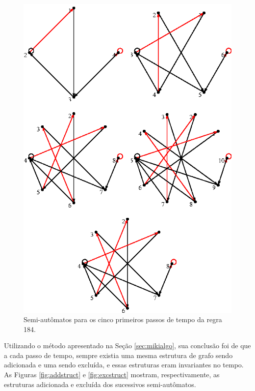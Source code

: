 \documentclass[12pt,a4paper]{article}
\begin{document}
\begin{figure}[htp]
\begin{center}
\includegraphics[scale=1]{img/184_5t.eps}
\caption{Semi-autômatos para os cinco primeiros passos de tempo da regra 184.}
\label{fig:184-5t}
\end{center}
\end{figure}

Utilizando o método apresentado na Seção \ref{sec:mikialgo}, sua conclusão
foi de que a cada passo de tempo, sempre existia uma mesma estrutura
de grafo sendo adicionada e uma sendo excluída, e essas estruturas eram
invariantes no tempo. As Figuras \ref{fig:addstruct} e \ref{fig:excstruct}
mostram, respectivamente, as estruturas adicionada e excluída dos sucessivos
semi-autômatos.
\end{document}
